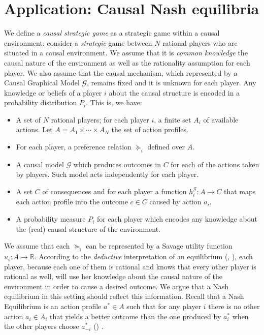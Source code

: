 \documentclass{article}
\theoremstyle{plain}
\begin{document}
\section{Application: Causal Nash equilibria}
We define a \textit{causal strategic game} as a strategic game within a causal environment: consider a \textit{strategic} game between $N$ rational players who are situated in a causal environment. We assume that it is \textit{common knowledge} the causal nature of the environment as well as the rationality assumption for each player. We also assume that the causal mechanism, which represented by a Causal Graphical Model $\mathcal{G}$, remains fixed and it is unknown for each player. Any knowledge or beliefs of a player $i$ about the causal structure is encoded in a probability distribution $P_i$.  This is, we have:
\begin{itemize}
\item A set of $N$ rational players; for each player $i$, a finite set $A_i$ of available actions. Let $A=A_1 \times \cdots \times A_N$ the set of action profiles.
\item For each player, a preference relation $\succeq_i$ defined over $A$.
\item A causal model $\mathcal{G}$ which produces outcomes in $C$ for each of the actions taken by players. Such model acts independently for each player.
\item A set $C$ of consequences and for each player a function $h^{\mathcal{G}}_i:A \to C$ that maps each action profile into the outcome $c \in C$ caused by action $a_i$.
\item A probability measure $P_i$ for each player which encodes any knowledge about the (real) causal structure of the environment.
\end{itemize}
We assume that each $\succeq_i$ can be represented by a Savage utility function $u_i: A \to \mathbb{R}$. According to the \textit{deductive} interpretation of an equilibrium (\cite{binmore1987modeling}, \cite{binmore1988modeling}), each player, because each one of them is rational and knows that every other player is rational as well, will use her knowledge about the causal nature of the environment in order to cause a desired outcome. We argue that a Nash equilibrium in this setting should reflect this information. Recall that a Nash Equilibrium is an action profile $a^\ast \in A$ such that for any player $i$ there is no other action $a_i \in A_i$ that yields a better outcome than the one produced by $a_i^\ast$ when the other players choose $a^\ast_{-i}$  (\cite{osborne1994course}) .
\end{document}
